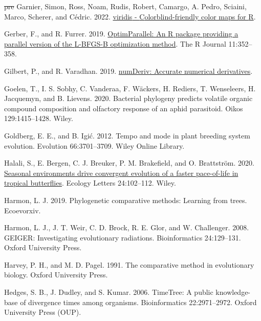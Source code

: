 \documentclass[fleqn,10pt,lineno]{wlpeerj}
\newlength{\cslhangindent}
\newlength{\cslentryspacingunit} %
\newenvironment{CSLReferences}[2] %
 {%
  \setlength{\parindent}{0pt}
  \ifodd #1
  \let\oldpar\par
  \def\par{\hangindent=\cslhangindent\oldpar}
  \fi
  \setlength{\parskip}{#2\cslentryspacingunit}
 }%
 {}
\providecommand{\DIFdeltex}[1]{{\protect\color{red}\sout{#1}}}                      %
\providecommand{\DIFdelend}{} %
\providecommand{\DIFdel}[1]{\texorpdfstring{\DIFdeltex{#1}}{}} %
\DeclareRobustCommand{\DIFdelend}{\DIFOaddend \let\includegraphics\DIFOincludegraphics} %
\begin{document}
\begin{CSLReferences}{1}{0}
{%
\DIFdel{pre}%
\DIFdelend \hypertarget{ref-Garnier2022}{}}%
Garnier, Simon, Ross, Noam, Rudis, Robert, Camargo, A. Pedro, Sciaini,
Marco, Scherer, and Cédric. 2022.
\href{https://doi.org/10.5281/zenodo.4679424}{{viridis} -
{C}olorblind-friendly color maps for {R}}.

\leavevmode{}%
Gerber, F., and R. Furrer. 2019.
\href{https://doi.org/10.32614/RJ-2019-030}{Optim{P}arallel: An {R}
package providing a parallel version of the {L-BFGS-B} optimization
method}. The R Journal 11:352--358.

\leavevmode{}%
Gilbert, P., and R. Varadhan. 2019.
\href{https://CRAN.R-project.org/package=numDeriv}{numDeriv: Accurate
numerical derivatives}.

\leavevmode{}%
Goelen, T., I. S. Sobhy, C. Vanderaa, F. Wäckers, H. Rediers, T.
Wenseleers, H. Jacquemyn, and B. Lievens. 2020. Bacterial phylogeny
predicts volatile organic compound composition and olfactory response of
an aphid parasitoid. Oikos 129:1415--1428. Wiley.

\leavevmode{}%
Goldberg, E. E., and B. Igić. 2012. Tempo and mode in plant breeding
system evolution. Evolution 66:3701--3709. Wiley Online Library.

\leavevmode{}%
Halali, S., E. Bergen, C. J. Breuker, P. M. Brakefield, and O.
Brattström. 2020. \href{https://doi.org/10.1111/ele.13626}{Seasonal
environments drive convergent evolution of a faster pace-of-life in
tropical butterflies}. Ecology Letters 24:102--112. Wiley.

\leavevmode{}%
Harmon, L. J. 2019. Phylogenetic comparative methods: Learning from
trees. Ecoevorxiv.

\leavevmode{}%
Harmon, L. J., J. T. Weir, C. D. Brock, R. E. Glor, and W. Challenger.
2008. {GEIGER}: Investigating evolutionary radiations. Bioinformatics
24:129--131. Oxford University Press.

\leavevmode{}%
Harvey, P. H., and M. D. Pagel. 1991. The comparative method in
evolutionary biology. Oxford University Press.

\leavevmode{}%
Hedges, S. B., J. Dudley, and S. Kumar. 2006. {TimeTree}: A public
knowledge-base of divergence times among organisms. Bioinformatics
22:2971--2972. Oxford University Press (OUP).


\end{CSLReferences}
\end{document}
